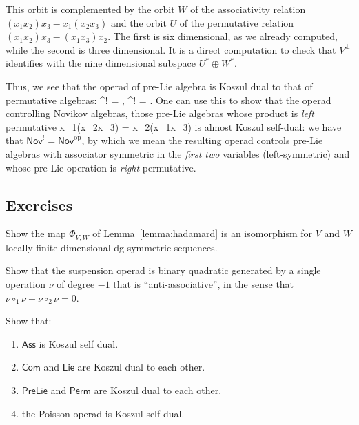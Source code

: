 \documentclass[fleqn, a4paper, twoside]{article}
\makeatletter
\newcommand{\0}{\langle 0\rangle}
\newenvironment{tenumerate}{
 \begin{enumerate}
  \setlength{\itemsep}{0pt}
  \setlength{\parskip}{0pt}
}{\end{enumerate}}
\let\[\@undefined
\DeclareRobustCommand{\[}{\begin{equation}}%
\let\]\@undefined
\DeclareRobustCommand{\]}{\end{equation}}%
\theoremstyle{mytheorem}
\theoremstyle{introthm}
\theoremstyle{mydefinition}
\theoremstyle{mydefinition2}
\theoremstyle{plain} %
\newcommand{\?}{\,?\,}
\theoremstyle{mytheorem}
\theoremstyle{plain} %
\makeatother
\begin{document}
This orbit is complemented by the orbit $W$ of the associativity relation
$(x_1x_2)x_3 - x_1(x_2x_3)$ and the orbit $U$ of the permutative relation
$(x_1x_2)x_3 - (x_1x_3)x_2$. The first is six dimensional, as we already
computed, while the second is three dimensional. It is a direct computation
to check that $V^\perp$ identifies with the nine dimensional subspace
$U^*\oplus W^*$. 

Thus, we see that the operad of pre-Lie algebra is Koszul dual to that
of permutative algebras:
\[ ^! = ,\quad
 	^! = .\]
One can use this to show that the operad controlling Novikov algebras,
those pre-Lie algebras whose product is \emph{left} permutative
\[ x_1(x_2x_3) = x_2(x_1x_3) \]
is almost Koszul self-dual: we have that $\mathsf{Nov}^! = 
\mathsf{Nov}^{\mathrm{op}}$, by which we mean the resulting
operad controls pre-Lie algebras with associator symmetric
in the \emph{first two} variables (left-symmetric) and 
whose pre-Lie operation is \emph{right} permutative.
\subsection{Exercises}

\begin{question}\label{ex:suspensions}
Show the map $\Phi_{V,W}$ of Lemma~\ref{lemma:hadamard}
is an isomorphism for $V$ and $W$ locally finite dimensional
dg symmetric sequences.
\end{question}

\begin{question}\label{ex:suspensionoperad}
Show that the suspension operad is binary quadratic
generated by a single operation $\nu$ of degree $-1$
that is ``anti-associative'', in the sense that
$\nu\circ_1\nu + \nu\circ_2\nu=0$. 
\end{question}
\begin{question} Show that:
\begin{tenumerate}
\item $\mathsf{Ass}$ is Koszul
self dual.
\item $\mathsf{Com}$ and $\mathsf{Lie}$
are Koszul dual to each other.
\item $\mathsf{PreLie}$
and $\mathsf{Perm}$ are Koszul dual to each
other.
\item the Poisson operad is Koszul self-dual.
\end{tenumerate}
\end{question}
\end{document}
